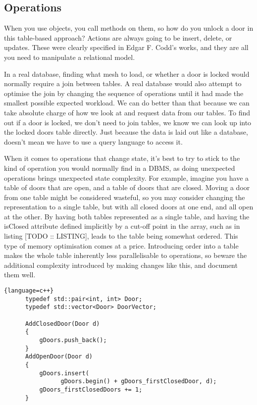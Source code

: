 \documentclass[a4paper,12pt]{article}
\begin{document}
\subsection{Operations}

When you use objects, you call methods on them, so how do you unlock a door in this table-based approach?
Actions are always going to be insert, delete, or updates.
These were clearly specified in Edgar F. Codd's works, and they are all you need to manipulate a relational model.

In a real database, finding what mesh to load, or whether a door is locked would normally require a join between tables.
A real database would also attempt to optimise the join by changing the sequence of operations until it had made the smallest possible expected workload.
We can do better than that because we can take absolute charge of how we look at and request data from our tables.
To find out if a door is locked, we don't need to join tables, we know we can look up into the locked doors table directly.
Just because the data is laid out like a database, doesn't mean we have to use a query language to access it.

When it comes to operations that change state, it's best to try to stick to the kind of operation you would normally find in a DBMS, as doing unexpected operations brings unexpected state complexity.
For example, imagine you have a table of doors that are open, and a table of doors that are closed.
Moving a door from one table might be considered wasteful, so you may consider changing the representation to a single table, but with all closed doors at one end, and all open at the other.
By having both tables represented as a single table, and having the isClosed attribute defined implicitly by a cut-off point in the array, such as in listing [TODO :: LISTING], leads to the table being somewhat ordered.
This type of memory optimisation comes at a price.
Introducing order into a table makes the whole table inherently less parallelisable to operations, so beware the additional complexity introduced by making changes like this, and document them well.

\begin{lstlisting}{language=c++}
      typedef std::pair<int, int> Door;
      typedef std::vector<Door> DoorVector;
      
      AddClosedDoor(Door d)
      {
          gDoors.push_back();
      }
      AddOpenDoor(Door d)
      {
          gDoors.insert(
                gDoors.begin() + gDoors_firstClosedDoor, d);
          gDoors_firstClosedDoors += 1;
      }
\end{lstlisting}
\end{document}
